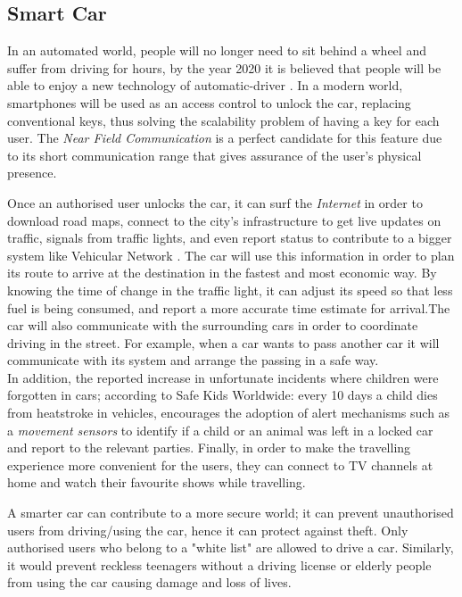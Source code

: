 \documentclass{llncs}
\begin{document}
 \subsection{Smart Car}
 In an automated world, people will no longer need to sit behind a wheel and suffer from driving for hours, by the year 2020 it is believed that people will be able to enjoy a new technology of automatic-driver \cite{Rosenblatt2014}. In a modern world, smartphones will be used as an access control to unlock the car\cite{Clark2010,Telekom2011}, replacing conventional keys, thus solving the scalability problem of having a key for each user. The \textit{Near Field Communication} is a perfect candidate for this feature due to its short communication range that gives assurance of the user's physical presence.
 
 Once an authorised user unlocks the car, it can surf the \textit{Internet} in order to download road maps, connect to the city's infrastructure to get live updates on traffic, signals from traffic lights, and even report status to contribute to a bigger system like Vehicular Network \cite{Moustafa2009}. The car will use this information in order to plan its route to arrive at the destination in the fastest and most economic way. By knowing the time of change in the traffic light, it can adjust its speed so that less fuel is being consumed, and report a more accurate time estimate for arrival.The car will also communicate with the surrounding cars in order to coordinate driving in the street. For example, when a car wants to pass another car it will communicate with its system and arrange the passing in a safe way.  \\
 In addition, the reported increase in unfortunate incidents where children were forgotten in cars; according to Safe Kids Worldwide: every 10 days a child dies from heatstroke in vehicles\cite{Heatstroke2014}, encourages the adoption of alert mechanisms such as a \textit{movement sensors} to identify if a child or an animal was left in a locked car and report to the relevant parties. Finally, in order to make the travelling experience more convenient for the users, they can connect to TV channels at home and watch their favourite shows while travelling. 
 
 A smarter car can contribute to a more secure world; it can prevent unauthorised users from driving/using the car, hence it can protect against theft. Only authorised users who belong to a "white list" are allowed to drive a car. Similarly, it would prevent reckless teenagers without a driving license or elderly people from using the car causing damage and loss of lives. 
 
\end{document}

